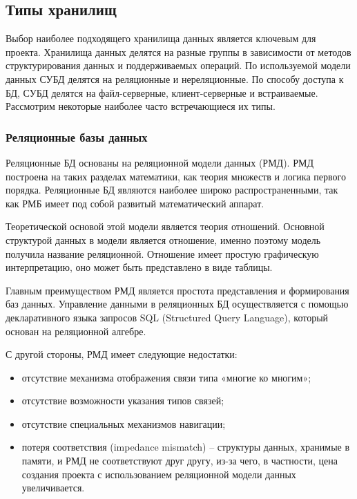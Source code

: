\documentclass[a4paper,14pt]{article}
\begin{document}
\subsection{Типы хранилищ}

Выбор наиболее подходящего хранилища данных является ключевым для проекта. Хранилища данных делятся на разные группы в зависимости от методов структурирования данных и поддерживаемых операций. По используемой модели данных СУБД делятся на реляционные и нереляционные. По способу доступа к БД, СУБД делятся на файл-серверные, клиент-серверные и встраиваемые. Рассмотрим некоторые наиболее часто встречающиеся их типы.

\subsubsection{Реляционные базы данных}

Реляционные БД основаны на реляционной модели данных (РМД). РМД построена на таких разделах математики, как теория множеств и логика первого порядка. Реляционные БД являются наиболее широко распространенными, так как РМБ имеет под собой развитый математический аппарат.

Теоретической основой этой модели является теория отношений. Основной структурой данных в модели является отношение, именно поэтому модель получила название реляционной. Отношение имеет простую графическую интерпретацию, оно может быть представлено в виде таблицы.

Главным преимуществом РМД является простота представления и формирования баз данных. Управление данными в реляционных БД осуществляется с помощью декларативного языка запросов SQL (Structured Query Language), который основан на реляционной алгебре.

С другой стороны, РМД имеет следующие недостатки:

\begin{itemize}
	\item отсутствие механизма отображения связи типа «многие ко многим»;
	\item отсутствие возможности указания типов связей;
	\item отсутствие специальных механизмов навигации;
	\item потеря соответствия (impedance mismatch) – структуры данных, хранимые в памяти, и РМД не соответствуют друг другу, из-за чего, в частности, цена создания проекта с использованием реляционной модели данных увеличивается.
\end{itemize}
\end{document}
